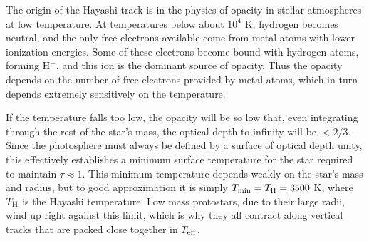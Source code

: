 The origin of the Hayashi track is in the physics of opacity in stellar atmospheres at low temperature. At temperatures below about $10^4$ K, hydrogen becomes neutral, and the only free electrons available come from metal atoms with lower ionization energies. Some of these electrons become bound with hydrogen atoms, forming H$^-$, and this ion is the dominant source of opacity.  Thus the opacity depends on the number of free electrons provided by metal atoms, which in turn depends extremely sensitively on the temperature.

If the temperature falls too low, the opacity will be so low that, even integrating through the rest of the star's mass, the optical depth to infinity will be $<2/3$. Since the photosphere must always be defined by a surface of optical depth unity, this effectively establishes a minimum surface temperature for the star required to maintain $\tau \approx 1$. This minimum temperature depends weakly on the star's mass and radius, but to good approximation it is simply $T_{\rm min} = T_{\rm H} = 3500$ K, where $T_{\rm H}$ is the Hayashi temperature. Low mass protostars, due to their large radii, wind up right against this limit, which is why they all contract along vertical tracks that are packed close together in $T_{\rm eff}$.

